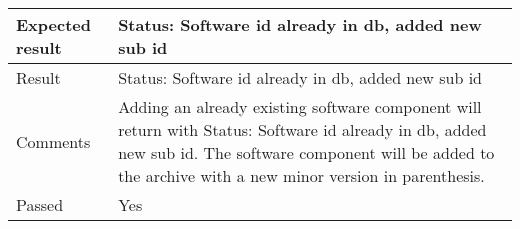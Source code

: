 \begin{table}[H]
\begin{tabularx}{1.0\textwidth}{
    |p{}     %
    |p{}|    %
}
Expected result
& Status: Software id already in db, added new sub id
\\
\hline

Result
& Status: Software id already in db, added new sub id
\\
\hline

Comments
& Adding an already existing software component will return with Status: Software id already in db, added new sub id. The software component will be added to the archive with a new minor version in parenthesis. 
\\
\hline

Passed
& Yes
\\
\hline


\end{tabularx}
\end{table}

